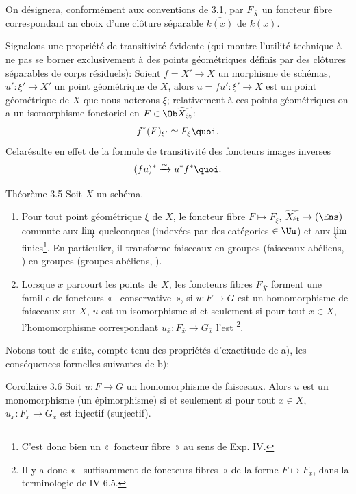 \documentclass[10pt]{../fichiers-configuration-latex/smfart}
\begin{document}
On désignera, conformément aux conventions de \hyperref[VIII.subsec3.1]{3.1},
par $F_{\bar{X}}$
un foncteur fibre correspondant an choix d'une clôture séparable
$\bar{k(x)}$ de $k(x)$.

Signalons une propriété de transitivité évidente (qui montre l'utilité
technique à ne pas se borner exclusivement à des points géométriques
définis par des clôtures séparables de corps résiduels): Soient $f =
X'\to X$ un morphisme de schémas, $u' : \xi'\to X'$ un point
géométrique de $X$, alors $u = f u': \xi'\to X$ est un point
géométrique de $X$ que nous noterons $\xi$; relativement à ces points
géométriques on a un isomorphisme fonctoriel en $F \in \Ob
\widetilde{X_{\text{ét}}}$:
$$
f^{\ast} (F)_{\xi'} \simeq F_{\xi}{\quoi}.
$$
Cela\pageoriginale  résulte en effet de la formule de transitivité des
foncteurs
images inverses
$$
(fu)^{\ast} \xrightarrow{\sim} u^{\ast} f^{\ast}{\quoi}.
$$

\begin{enonce*}{Théorème 3.5}
Soit $X$ un schéma.
\begin{enumerate}
\renewcommand{\theenumi}{\alph{enumi}}
\renewcommand{\labelenumi}{\theenumi)}
\item Pour tout point géométrique $\xi$ de $X$, le foncteur fibre $F
  \mapsto F_{\xi}$, $\widetilde{X_{\text{\rm ét}}} \to (\Ens)$ commute aux
  $\varinjlim$ quelconques (indexées par des catégories $\in
  \Uu$) et aux $\varprojlim$ finies\footnote{C'est donc bien
  un « foncteur fibre » au sens de Exp. IV.}. En particulier, il
  transforme faisceaux en groupes (\resp faisceaux abéliens, \etc)
  en groupes (\resp groupes abéliens, \etc).

\item Lorsque $x$ parcourt les points de $X$, les foncteurs fibres
  $F_{\bar{X}}$ forment une famille de foncteurs «   conservative », \ie si $u : F \to G$ est un homomorphisme de
  faisceaux sur $X$, $u$ est un isomorphisme si et seulement si pour
  tout $x \in X$, l'homomorphisme correspondant $u_{\bar{x}} :
  F_{\bar{x}} \to G_{\bar{x}}$ l'est \footnote{Il y a donc «   suffisamment de foncteurs fibres » de la forme $F \mapsto
  F_{\bar{x}}$, dans la terminologie de IV 6.5.}.
\end{enumerate}
\end{enonce*}

Notons tout de suite, compte tenu des propriétés d'exactitude de a),
les conséquences formelles suivantes de b):

\begin{enonce*}{Corollaire 3.6}
Soit $u : F \to G$ un homomorphisme de faisceaux. Alors $u$ est un
monomorphisme (\resp un épimorphisme) si et seulement si pour tout $x
\in X$, $u_{\bar{x}}:F_{\bar{x}}\to G_{\bar{x}}$ est injectif
(\resp surjectif).
\end{enonce*}
\end{document}

